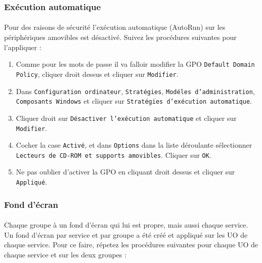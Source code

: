 		\subsubsection{Exécution automatique}
			\paragraph{}
				Pour des raisons de sécurité l'exécution automatique (AutoRun) sur les périphériques amovibles est désactivé. Suivez les procédures suivantes pour l'appliquer :
				\begin{enumerate}
					\item Comme pour les mots de passe il va falloir modifier la GPO \texttt{Default Domain Policy}, cliquer droit dessus et cliquer sur \texttt{Modifier}. 
					\item Dans \texttt{Configuration ordinateur}, \texttt{Stratégies}, \texttt{Modéles d'administration}, \texttt{Composants Windows} et cliquer sur \texttt{Stratégies d'exécution automatique}.
					\item Cliquer droit sur \texttt{Désactiver l'exécution automatique} et cliquer sur \texttt{Modifier}.
					\item Cocher la case \texttt{Activé}, et dans \texttt{Options} dans la liste déroulante sélectionner \texttt{Lecteurs de CD-ROM et supports amovibles}. Cliquer sur \texttt{OK}.
					\item Ne pas oublier d'activer la GPO en cliquant droit dessus et cliquer sur \texttt{Appliqué}.
				\end{enumerate}
		\subsubsection{Fond d'écran}
			\paragraph{}
				Chaque groupe à un fond d'écran qui lui est propre, mais aussi chaque service. Un fond d'écran par service et par groupe a été créé et appliqué sur les UO de chaque service. Pour ce faire, répetez les procédures suivantes pour chaque UO de chaque service et sur les deux groupes :

